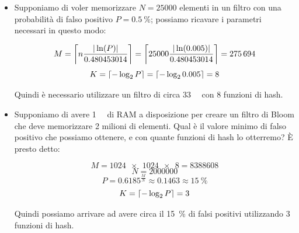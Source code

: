 \begin{itemize}
	\medskip

	\item Supponiamo di voler memorizzare $N=\num{25000}$ elementi in un filtro con una probabilità di
	falso positivo $P=\SI{0.5}{\percent}$; possiamo ricavare i parametri necessari in questo modo:

	$$ M = \ceil*{n\frac{|\ln(P)|}{0.480453014}} = \ceil*{25000\frac{|\ln(0.005)|}{0.480453014}} = \num{275694} $$
	$$ K = \ceil*{-\log_2{P}} = \ceil*{-\log_2{0.005}} = 8 $$

	Quindi è necessario utilizzare un filtro di circa \SI{33}{\kibi\byte} con \num{8} funzioni di hash.

	\item Supponiamo di avere \SI{1}{\mebi\byte} di RAM a disposizione per creare un filtro di Bloom che deve
	memorizzare 2 milioni di elementi. Qual è il valore minimo di falso positivo che possiamo
	ottenere, e con quante funzioni di hash lo otterremo? È presto detto:

	$$ M = \num{1024 x 1024 x 8} = \num{8388608} $$
	$$ N = \num{2000000} $$
	$$ P = 0.6185 ^ \frac{M}{N} \approx 0.1463 \approx \SI{15}{\percent} $$
	$$ K = \ceil*{-\log_2{P}} = 3 $$

	Quindi possiamo arrivare ad avere circa il \SI{15}{\percent} di falsi positivi utilizzando
	\num{3} funzioni di hash.
\end{itemize}

